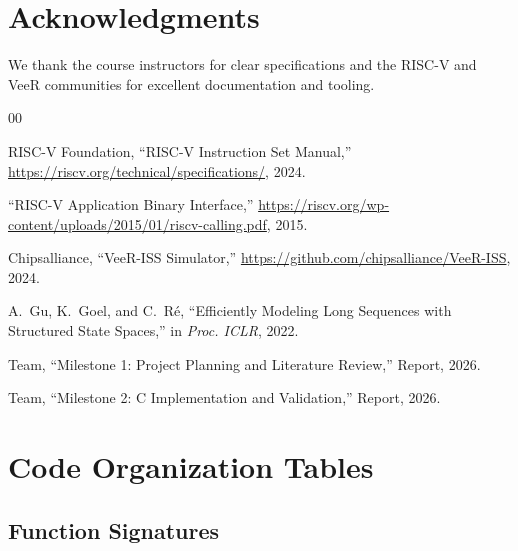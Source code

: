 \documentclass[conference]{IEEEtran}
\begin{document}
\section*{Acknowledgments}

We thank the course instructors for clear specifications and the RISC-V and VeeR communities for excellent documentation and tooling.

\begin{thebibliography}{00}

RISC-V Foundation, ``RISC-V Instruction Set Manual,'' \url{https://riscv.org/technical/specifications/}, 2024.

``RISC-V Application Binary Interface,'' \url{https://riscv.org/wp-content/uploads/2015/01/riscv-calling.pdf}, 2015.

Chipsalliance, ``VeeR-ISS Simulator,'' \url{https://github.com/chipsalliance/VeeR-ISS}, 2024.

A.~Gu, K.~Goel, and C.~Ré, ``Efficiently Modeling Long Sequences with Structured State Spaces,'' in \textit{Proc. ICLR}, 2022.

Team, ``Milestone 1: Project Planning and Literature Review,'' Report, 2026.

Team, ``Milestone 2: C Implementation and Validation,'' Report, 2026.

\end{thebibliography}

\appendix

\section{Code Organization Tables}

\subsection{Function Signatures}
\end{document}
